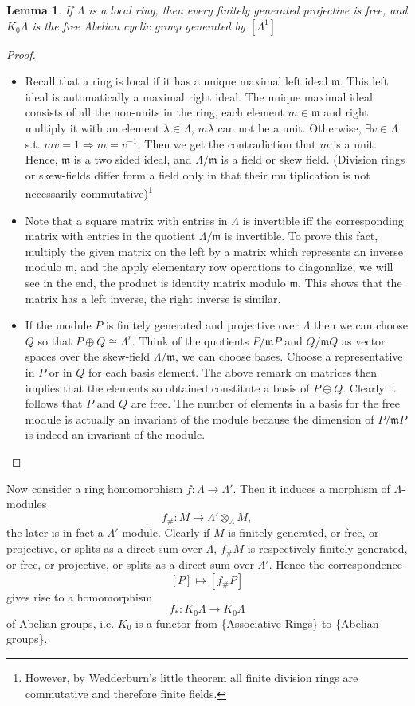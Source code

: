 \documentclass[11pt]{article}
\newtheorem{lemma}[thm]{Lemma}
\newcommand{\scm}{{\mathfrak m}}
\newcommand{\rta}{\rightarrow}
\begin{document}
\begin{lemma}
If $\Lambda$ is a local ring, then every finitely generated projective is free, and $K_0\Lambda$ is the free Abelian cyclic group generated by $[\Lambda^1]$
\end{lemma}
\begin{proof}\ 
\begin{itemize}
\item 
Recall that a ring is local if it has a unique maximal left ideal $\scm$. This left ideal is automatically a maximal right ideal. The unique maximal ideal consists of all the non-units in the ring, each element $m\in \scm$ and right multiply it with an element $\lambda\in\Lambda$, $m\lambda$ can not be a unit. Otherwise, $\exists v\in \Lambda$ s.t. $mv=1\Longrightarrow m=v^{-1}$. Then we get the contradiction that $m$ is a unit. Hence, $\scm$ is a two sided ideal, and $\Lambda/\scm$ is a field or skew field. (Division rings or skew-fields differ form a field only in that their multiplication is not necessarily commutative)\footnote{However, by Wedderburn's little theorem all finite division rings are commutative and therefore finite fields.}
\item Note that a square matrix with entries in $\Lambda$ is invertible iff the corresponding matrix with entries in the quotient $\Lambda/\scm$ is invertible. To prove this fact, multiply the given matrix on the left by a matrix which represents an inverse modulo $\scm$, and the apply elementary row operations to diagonalize, we will see in the end, the product is identity matrix modulo $\scm$. This shows that the matrix has a left inverse, the right inverse is similar.
\item If the module $P$ is finitely generated and projective over $\Lambda$ then we can choose $Q$ so that $P\oplus Q\cong \Lambda^r$. Think of the quotients $P/\scm P$ and $Q/\scm Q$ as vector spaces over the skew-field $\Lambda/\scm$, we can choose bases. Choose a representative in $P$ or in $Q$ for each basis element. The above remark on matrices then implies that the elements so obtained constitute a basis of $P\oplus Q$. Clearly it follows that $P$ and $Q$ are free. The number of elements in a basis for the free module is actually an invariant of the module because the dimension of $P/\scm P$ is indeed an invariant of the module. 
\end{itemize}
\end{proof}
Now consider a ring homomorphism $f:\Lambda\rta \Lambda'$. Then it induces a morphism of $\Lambda$-modules 
$$
f_\# : M\rta \Lambda'\otimes_\Lambda M,
$$
the later is in fact a $\Lambda'$-module. Clearly if $M$ is finitely generated, or free, or projective, or splits as a direct sum over $\Lambda$, $f_\# M$ is respectively finitely generated, or free, or projective, or splits as a direct sum over $\Lambda'$. Hence the correspondence 
$$
[P]\mapsto [f_\# P]
$$ 
gives rise to a homomorphism 
$$
f_*: K_0\Lambda \rta K_0\Lambda
$$
of Abelian groups, i.e. $K_0$ is a functor from \{Associative Rings\} to \{Abelian groups\}.
\end{document}
